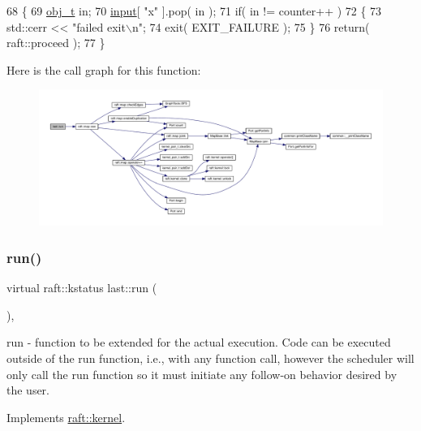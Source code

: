 \begin{DoxyCode}
68     \{
69         \hyperlink{structfoo}{obj\_t} in;
70         \hyperlink{classraft_1_1kernel_a6edbe35a56409d402e719b3ac36d6554}{input}[ \textcolor{stringliteral}{"x"} ].pop( in );
71         \textcolor{keywordflow}{if}( in != counter++ )
72         \{
73             std::cerr << \textcolor{stringliteral}{"failed exit\(\backslash\)n"};
74             exit( EXIT\_FAILURE );
75         \}
76         \textcolor{keywordflow}{return}( raft::proceed );
77     \}
\end{DoxyCode}
Here is the call graph for this function\+:
\nopagebreak
\begin{figure}[H]
\begin{center}
\leavevmode
\includegraphics[width=350pt]{classlast_a7a1da1c30f571a8e8ccb515ca2cb2f02_cgraph}
\end{center}
\end{figure}
\hypertarget{classlast_a7a1da1c30f571a8e8ccb515ca2cb2f02}{}\label{classlast_a7a1da1c30f571a8e8ccb515ca2cb2f02} 
\subsubsection{\texorpdfstring{run()}{run()}\hspace{0.1cm}{\footnotesize\ttfamily [2/6]}}
{\footnotesize\ttfamily virtual raft\+::kstatus last\+::run (\begin{DoxyParamCaption}{ }\end{DoxyParamCaption})\hspace{0.3cm}{\ttfamily [inline]}, {\ttfamily [virtual]}}

run -\/ function to be extended for the actual execution. Code can be executed outside of the run function, i.\+e., with any function call, however the scheduler will only call the run function so it must initiate any follow-\/on behavior desired by the user. 

Implements \hyperlink{classraft_1_1kernel_a05094286d7577360fb1b91c91fc05901}{raft\+::kernel}.



